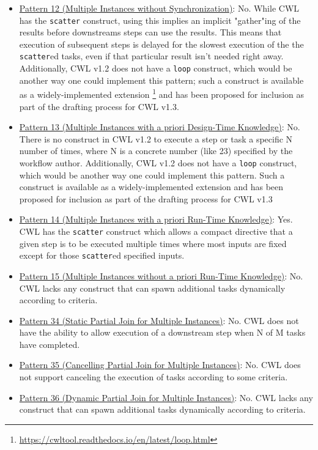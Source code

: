 \begin{itemize}
\item \href{http://www.workflowpatterns.com/patterns/control/multiple_instance/wcp12.php}{Pattern 12 (Multiple Instances without Synchronization)}: No. While CWL has the \verb|scatter| construct, using this implies an implicit "gather"ing of the results before downstreams steps can use the results. This means that execution of subsequent steps is delayed for the slowest execution of the the \verb|scatter|ed tasks, even if that particular result isn't needed right away. Additionally, CWL v1.2 does not have a \verb|loop| construct, which would be another way one could implement this pattern; such a construct is available as a widely-implemented extension \footnote{\url{https://cwltool.readthedocs.io/en/latest/loop.html}} and has been proposed for inclusion as part of the drafting process for CWL v1.3.

\item \href{http://www.workflowpatterns.com/patterns/control/multiple_instance/wcp13.ph}{Pattern 13 (Multiple Instances with a priori Design-Time Knowledge)}: No. There is no construct in CWL v1.2 to execute a step or task a specific N number of times, where N is a concrete number (like 23) specified by the workflow author. Additionally, CWL v1.2 does not have a \verb|loop| construct, which would be another way one could implement this pattern. Such a construct is available as a widely-implemented extension and has been proposed for inclusion as part of the drafting process for CWL v1.3

\item \href{http://www.workflowpatterns.com/patterns/control/multiple_instance/wcp14.php}{Pattern 14 (Multiple Instances with a priori Run-Time Knowledge)}: Yes. CWL has the \verb|scatter| construct which allows a compact directive that a given step is to be executed multiple times where most inputs are fixed except for those \verb|scatter|ed specified inputs.

\item \href{http://www.workflowpatterns.com/patterns/control/multiple_instance/wcp15.php}{Pattern 15 (Multiple Instances without a priori Run-Time Knowledge)}: No. CWL lacks any construct that can spawn additional tasks dynamically according to criteria.

\item \href{http://www.workflowpatterns.com/patterns/control/new/wcp34.php}{Pattern 34 (Static Partial Join for Multiple Instances)}: No. CWL does not have the ability to allow execution of a downstream step when N of M tasks have completed.

\item \href{http://www.workflowpatterns.com/patterns/control/new/wcp35.php}{Pattern 35 (Cancelling Partial Join for Multiple Instances)}: No. CWL does not support canceling the execution of tasks according to some criteria.

\item \href{http://www.workflowpatterns.com/patterns/control/new/wcp36.php}{Pattern 36 (Dynamic Partial Join for Multiple Instances)}: No. CWL lacks any construct that can spawn additional tasks dynamically according to criteria.
\end{itemize}
